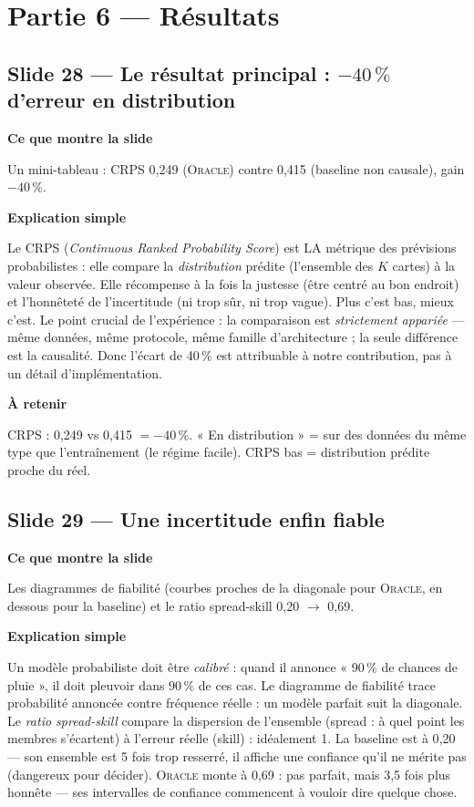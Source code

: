 \documentclass[11pt,a4paper]{article}
\newcommand{\slide}[2]{\subsection*{\textcolor{bleu}{Slide #1 --- #2}}}
\newcommand{\bloc}[1]{\par\medskip\noindent\textcolor{accent}{\textbf{#1}}\par\nopagebreak\smallskip}
\begin{document}
\section{Partie 6 --- Résultats}

\slide{28}{Le résultat principal : $-40\,\%$ d'erreur en distribution}

\bloc{Ce que montre la slide}
Un mini-tableau : CRPS 0{,}249 (\textsc{Oracle}) contre 0{,}415 (baseline non causale), gain $-40\,\%$.

\bloc{Explication simple}
Le CRPS (\emph{Continuous Ranked Probability Score}) est LA métrique des prévisions probabilistes : elle compare la \emph{distribution} prédite (l'ensemble des $K$ cartes) à la valeur observée. Elle récompense à la fois la justesse (être centré au bon endroit) et l'honnêteté de l'incertitude (ni trop sûr, ni trop vague). Plus c'est bas, mieux c'est. Le point crucial de l'expérience : la comparaison est \emph{strictement appariée} --- même données, même protocole, même famille d'architecture ; la seule différence est la causalité. Donc l'écart de 40\,\% est attribuable à notre contribution, pas à un détail d'implémentation.

\bloc{À retenir}
CRPS : 0{,}249 vs 0{,}415 $= -40\,\%$. « En distribution » = sur des données du même type que l'entraînement (le régime facile). CRPS bas = distribution prédite proche du réel.

\slide{29}{Une incertitude enfin fiable}

\bloc{Ce que montre la slide}
Les diagrammes de fiabilité (courbes proches de la diagonale pour \textsc{Oracle}, en dessous pour la baseline) et le ratio spread-skill 0{,}20 $\to$ 0{,}69.

\bloc{Explication simple}
Un modèle probabiliste doit être \emph{calibré} : quand il annonce « 90\,\% de chances de pluie », il doit pleuvoir dans 90\,\% de ces cas. Le diagramme de fiabilité trace probabilité annoncée contre fréquence réelle : un modèle parfait suit la diagonale. Le \emph{ratio spread-skill} compare la dispersion de l'ensemble (spread : à quel point les membres s'écartent) à l'erreur réelle (skill) : idéalement 1. La baseline est à 0{,}20 --- son ensemble est 5 fois trop resserré, il affiche une confiance qu'il ne mérite pas (dangereux pour décider). \textsc{Oracle} monte à 0{,}69 : pas parfait, mais 3,5 fois plus honnête --- ses intervalles de confiance commencent à vouloir dire quelque chose.
\end{document}
